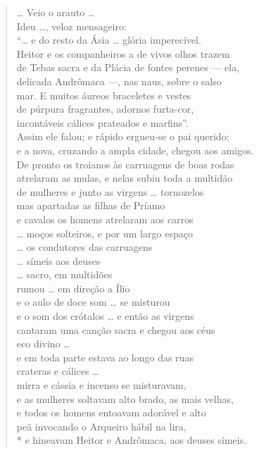{\begin{verse}
\ldots{} Veio o arauto \ldots{}\\
Ideu \ldots{}, veloz mensageiro:\\
“\ldots{} e do resto da Ásia \ldots{} glória imperecível.\\
Heitor e os companheiros a de vivos olhos trazem\\
de Tebas sacra e da Plácia de fontes perenes --- ela,\\
delicada Andrômaca ---, nas naus, sobre o salso\\
mar. E muitos áureos braceletes e vestes\\
de púrpura fragrantes, adornos furta-cor,\\
incontáveis cálices prateados e marfins”.\\
Assim ele falou; e rápido ergueu-se o pai querido;\\
e a nova, cruzando a ampla cidade, chegou aos amigos.\\
De pronto os troianos às carruagens de boas rodas\\
atrelaram as mulas, e nelas subiu toda a multidão \\
de mulheres e junto as virgens \ldots{} tornozelos\\
mas apartadas as filhas de Príamo\\
e cavalos os homens atrelaram aos carros\\
\ldots{} moços solteiros, e por um largo espaço \\
\ldots{} os condutores das carruagens \\
\ldots{} símeis aos deuses\\
\ldots{} sacro, em multidões\\
rumou \ldots{} em direção a Ílio\\
e o aulo de doce som \ldots{} se misturou\\
e o som dos crótalos \ldots{} e então as virgens\\
cantaram uma canção sacra e chegou aos céus\\
eco divino \ldots{}\\
e em toda parte estava ao longo das ruas\\
crateras e cálices \ldots{}\\
mirra e cássia e incenso se misturavam,\\
e as mulheres soltavam alto brado, as mais velhas,\\
e todos os homens entoavam adorável e alto\\
peã invocando o Arqueiro hábil na lira,\\*
e hineavam Heitor e Andrômaca, aos deuses símeis.
\end{verse}

}
